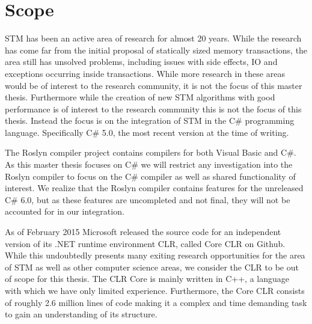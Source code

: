 \section{Scope}\label{sec:scope}
\ac{STM} has been an active area of research for almost 20 years\cite{shavit1997software}. While the research has come far from the initial proposal of statically sized memory transactions, the area still has unsolved problems, including issues with side effects, \ac{IO} and exceptions occurring inside transactions\cite{harris2005exceptions}. While more research in these areas would be of interest to the research community, it is not the focus of this master thesis. Furthermore while the creation of new \ac{STM} algorithms with good performance is of interest to the research community this is not the focus of this thesis. Instead the focus is on the integration of \ac{STM} in the C\# programming language. Specifically C\# 5.0, the most recent version at the time of writing\cite{csharp2013specificaiton}.


The Roslyn compiler project contains compilers for both Visual Basic and C\#\cite{roslyn}. As this master thesis focuses on C\# we will restrict any investigation into the Roslyn compiler to focus on the C\# compiler as well as shared functionality of interest. We realize that the Roslyn compiler contains features for the unreleased C\# 6.0, but as these features are uncompleted and not final, they will not be accounted for in our integration.

As of February 2015 Microsoft released the source code for an independent version of its .NET runtime environment \acl{CLR}, called Core \ac{CLR} on Github\cite{coreclr}. While this undoubtedly presents many exiting research opportunities for the area of \ac{STM} as well as other computer science areas, we consider the \ac{CLR} to be out of scope for this thesis. The \ac{CLR} Core is mainly written in C++\cite{coreclr}, a language with which we have only limited experience. Furthermore, the Core \ac{CLR} consists of roughly 2.6 million lines of code\cite{coreclrBlog} making it a complex and time demanding task to gain an understanding of its structure.

